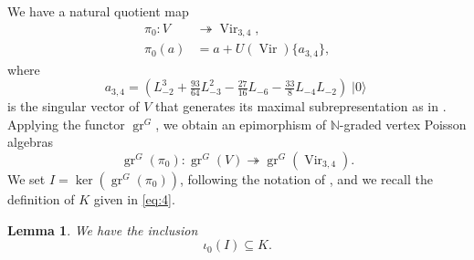 \documentclass[a4paper, 12pt, reqno]{amsart}
\newtheorem{lemma}[theorem]{Lemma}
\theoremstyle{remark}
\DeclareMathOperator{\Vir}{Vir}
\DeclareMathOperator{\gr}{gr}
\DeclareMathOperator{\vac}{|0\rangle}
\begin{document}
We have a natural quotient map
\begin{align*}
  \pi_0: V &\twoheadrightarrow \Vir_{3, 4}, \\
  \pi_0(a) &= a + U(\Vir)\{a_{3, 4}\},
\end{align*}
where
\begin{equation*}
  a_{3, 4} = (L_{-2}^3 + \tfrac{93}{64}L_{-3}^2 - \tfrac{27}{16}L_{-6} - \tfrac{33}{8}L_{-4}L_{-2})\vac
\end{equation*}
is the singular vector of $V$ that generates its maximal subrepresentation as in \cite{andrews_singular_2022}.
Applying the functor $\gr^G$, we obtain an epimorphism of $\mathbb{N}$-graded vertex Poisson algebras
\begin{equation*}
  \gr^G(\pi_0): \gr^G(V) \twoheadrightarrow \gr^G(\Vir_{3, 4}).
\end{equation*}
We set $I = \ker(\gr^G(\pi_0))$, following the notation of \cite{andrews_singular_2022}, and we recall the definition of $K$ given in \eqref{eq:4}.

\begin{lemma}
  \label{lmm:9}
  We have the inclusion
  \begin{equation*}
    \iota_0(I) \subseteq K.
  \end{equation*}
\end{lemma}
\end{document}
